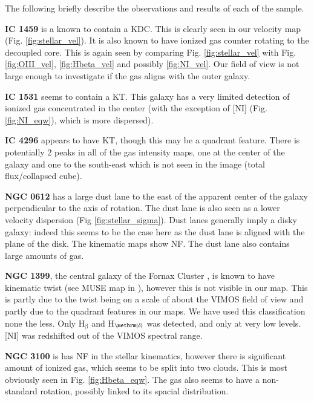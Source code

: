 \documentclass[fleqn,usenatbib,useAMS]{mnras}
\begin{document}
	The following briefly describe the observations and results of each of the sample. %

	\textbf{IC 1459} is a known to contain a KDC. This is clearly seen in our velocity map (Fig. \ref{fig:stellar_vel}). It is also known to have ionized gas counter rotating to the decoupled core. This is again seen by comparing Fig. \ref{fig:stellar_vel} with Fig. \ref{fig:OIII_vel}, \ref{fig:Hbeta_vel} and possibly \ref{fig:NI_vel}. Our field of view is not large enough to investigate if the gas aligns with the outer galaxy.

	\textbf{IC 1531} seems to contain a KT. This galaxy has a very limited detection of ionized gas concentrated in the center (with the exception of [NI] (Fig. \ref{fig:NI_eqw}), which is more dispersed).

	\textbf{IC 4296} appears to have KT, though this may be a quadrant feature. There is potentially 2 peaks in all of the gas intensity maps, one at the center of the galaxy and one to the south-east which is not seen in the image (total flux/collapsed cube).

	\textbf{NGC 0612} has a large dust lane to the east of the apparent center of the galaxy perpendicular to the axis of rotation. The dust lane is also seen as a lower velocity dispersion (Fig \ref{fig:stellar_sigma}). Dust lanes generally imply a disky galaxy: indeed this seems to be the case here as the dust lane is aligned with the plane of the disk. The kinematic maps show NF. The dust lane also contains large amounts of gas. 

	\textbf{NGC 1399}, the central galaxy of the Fornax Cluster \citep{Jordan2007}, is known to have kinematic twist (see MUSE map in \citet{Zieleniewski2017}), however this is not visible in our map. This is partly due to the twist being on a scale of about the VIMOS field of view and partly due to the quadrant features in our maps. We have used this classification none the less. Only H$_\mathrm{\beta}$ and H$_\methrm{\delta}$ was detected, and only at very low levels. [NI] was redshifted out of the VIMOS spectral range.

	\textbf{NGC 3100} is has NF in the stellar kinematics, however there is significant amount of ionized gas, which seems to be split into two clouds. This is most obviously seen in Fig. \ref{fig:Hbeta_eqw}. The gas also seems to have a non-standard rotation, possibly linked to its spacial distribution. 
\end{document}
